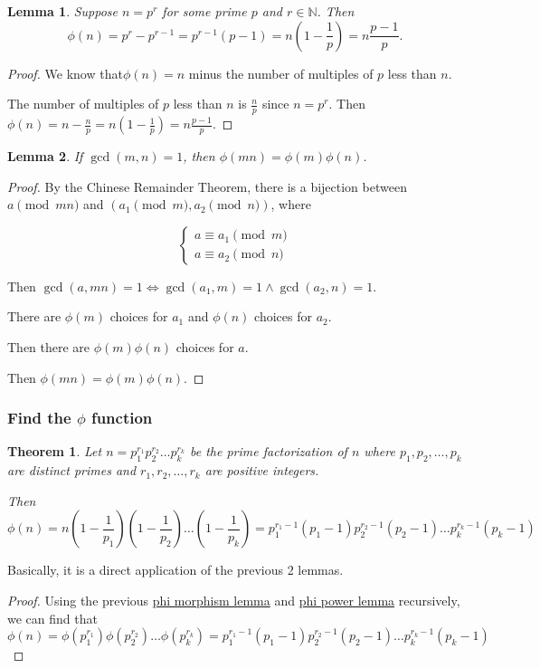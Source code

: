 \documentclass[letterpaper,12pt,oneside]{article}
\newtheorem{theorem}{Theorem}
\newtheorem*{lemma}{Lemma}
\begin{document}
\begin{lemma}\label{lem:phi power}
    Suppose $n=p^r$ for some prime $p$ and $r\in \mathbb{N}$. Then \[\phi(n)=p^r-p^{r-1}=p^{r-1}(p-1)=n(1-\frac{1}{p})=n\frac{p-1}{p}.\]
\end{lemma}
\begin{proof}
    We know that$\phi(n)=n$ minus the number of multiples of $p$ less than $n$. 

    The number of multiples of $p$ less than $n$ is $\frac{n}{p}$ since $n=p^r$. Then $\phi(n)=n-\frac{n}{p}=n(1-\frac{1}{p})=n\frac{p-1}{p}$.
\end{proof}
\begin{lemma}\label{lem:phi morphism}
    If $\gcd(m,n)=1$, then $\phi(mn)=\phi(m)\phi(n)$.
\end{lemma}
\begin{proof}
    By the Chinese Remainder Theorem, there is a bijection between $a\pmod {mn}$ and $(a_1\pmod m,a_2\pmod n)$, where 
    
    \[\begin{cases}
        a\equiv a_1 \pmod m \\
        a\equiv a_2 \pmod n
    \end{cases}\]

    Then $\gcd(a,mn)=1 \iff \gcd(a_1,m)=1 \land \gcd(a_2,n)=1$. 
    
    There are $\phi(m)$ choices for $a_1$ and $\phi(n)$ choices for $a_2$. 
    
    Then there are $\phi(m)\phi(n)$ choices for $a$. 
    
    Then $\phi(mn)=\phi(m)\phi(n)$.
\end{proof}
\subsubsection{Find the $\phi$ function}
\begin{theorem}
    Let $n=p_1^{r_1}p_2^{r_2}\ldots p_k^{r_k}$ be the prime factorization of $n$ where $p_1,p_2,\ldots,p_k$ are distinct primes and $r_1,r_2,\ldots,r_k$ are positive integers.
    
    Then \[\phi(n)=n(1-\frac{1}{p_1})(1-\frac{1}{p_2})\ldots (1-\frac{1}{p_k})=p_1^{r_1-1}(p_1-1)p_2^{r_2-1}(p_2-1)\ldots p_k^{r_k-1}(p_k-1)\]
\end{theorem}

Basically, it is a direct application of the previous 2 lemmas. 

\begin{proof}
    Using the previous \hyperref[lem:phi morphism]{phi morphism lemma} and \hyperref[lem:phi power]{phi power lemma} recursively, we can find that \[\phi(n)=\phi(p_1^{r_1})\phi(p_2^{r_2})\ldots \phi(p_k^{r_k})=p_1^{r_1-1}(p_1-1)p_2^{r_2-1}(p_2-1)\ldots p_k^{r_k-1}(p_k-1)\]
\end{proof}
\end{document}
